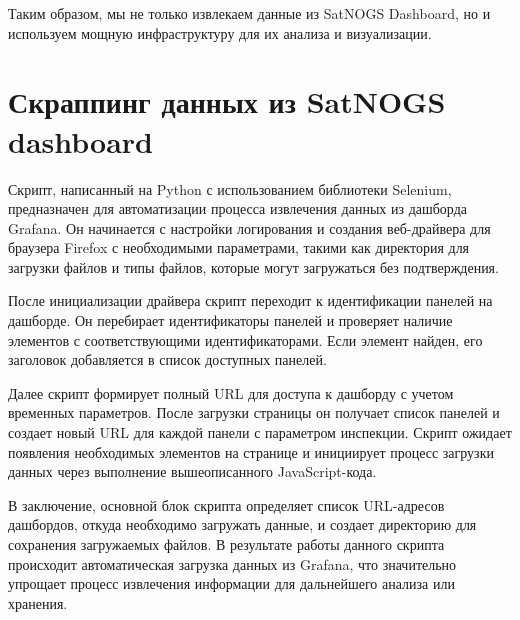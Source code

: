Таким образом, мы не только извлекаем данные из SatNOGS Dashboard, но и
используем мощную инфраструктуру для их анализа и визуализации.

\section{Скраппинг данных из SatNOGS dashboard}

Скрипт, написанный на Python с использованием библиотеки Selenium, предназначен
для автоматизации процесса извлечения данных из дашборда Grafana. Он начинается
с настройки логирования и создания веб-драйвера для браузера Firefox с
необходимыми параметрами, такими как директория для загрузки файлов и типы
файлов, которые могут загружаться без подтверждения.

После инициализации драйвера скрипт переходит к идентификации панелей на
дашборде. Он перебирает идентификаторы панелей и проверяет наличие элементов с
соответствующими идентификаторами. Если элемент найден, его заголовок
добавляется в список доступных панелей.

Далее скрипт формирует полный URL для доступа к дашборду с учетом временных
параметров. После загрузки страницы он получает список панелей и создает новый
URL для каждой панели с параметром инспекции. Скрипт ожидает появления
необходимых элементов на странице и инициирует процесс загрузки данных через
выполнение вышеописанного JavaScript-кода.

В заключение, основной блок скрипта определяет список URL-адресов дашбордов,
откуда необходимо загружать данные, и создает директорию для сохранения
загружаемых файлов. В результате работы данного скрипта происходит
автоматическая загрузка данных из Grafana, что значительно упрощает процесс
извлечения информации для дальнейшего анализа или хранения.
